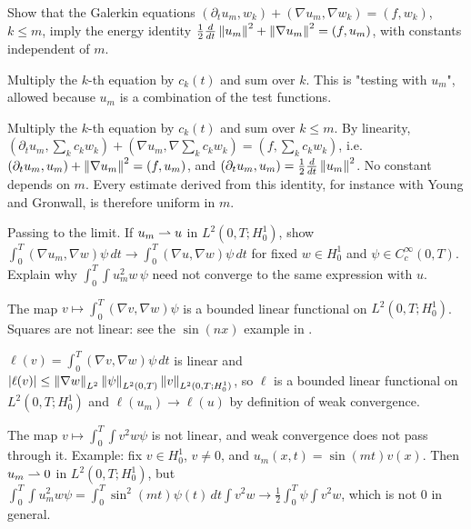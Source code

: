 \begin{exercise}
  Show that the Galerkin equations $(\partial_t u_m, w_k) + (\nabla u_m, \nabla w_k) = (f, w_k)$, $k \le m$, imply the energy identity $\frac12\frac{d}{dt}\left\lVert u_m\right\rVert^2 + \left\lVert \nabla u_m\right\rVert^2 = (f, u_m)$, with constants independent of $m$.
  \begin{hint}
    Multiply the $k$-th equation by $c_k(t)$ and sum over $k$. This is "testing with $u_m$", allowed because $u_m$ is a combination of the test functions.
  \end{hint}
  \begin{solution}
    Multiply the $k$-th equation by $c_k(t)$ and sum over $k \le m$. By linearity, $(\partial_tu_m, \sum_kc_kw_k) + (\nabla u_m, \nabla\sum_kc_kw_k) = (f, \sum_kc_kw_k)$, i.e. $(\partial_tu_m, u_m) + \left\lVert \nabla u_m\right\rVert^2 = (f, u_m)$, and $(\partial_tu_m, u_m) = \frac12\frac{d}{dt}\left\lVert u_m\right\rVert^2$. No constant depends on $m$. Every estimate derived from this identity, for instance with Young and Gronwall, is therefore uniform in $m$.
  \end{solution}
\end{exercise}

\begin{exercise}
  Passing to the limit. If $u_m \rightharpoonup u$ in $L^2(0,T;H^1_0)$, show $\int_0^T(\nabla u_m,\nabla w)\psi\,dt \to \int_0^T(\nabla u,\nabla w)\psi\,dt$ for fixed $w \in H^1_0$ and $\psi \in C_c^\infty(0,T)$. Explain why $\int_0^T\!\int u_m^2 w\,\psi$ need not converge to the same expression with $u$.
  \begin{hint}
    The map $v \mapsto \int_0^T(\nabla v,\nabla w)\psi$ is a bounded linear functional on $L^2(0,T;H^1_0)$. Squares are not linear: see the $\sin(nx)$ example in .
  \end{hint}
  \begin{solution}
    $\ell(v) = \int_0^T(\nabla v, \nabla w)\psi\,dt$ is linear and $|\ell(v)| \le \left\lVert \nabla w\right\rVert_{L^2}\left\lVert \psi\right\rVert_{L^2(0,T)}\left\lVert v\right\rVert_{L^2(0,T;H^1_0)}$, so $\ell$ is a bounded linear functional on $L^2(0,T;H^1_0)$ and $\ell(u_m) \to \ell(u)$ by definition of weak convergence.

    The map $v \mapsto \int_0^T\!\!\int v^2w\psi$ is not linear, and weak convergence does not pass through it. Example: fix $v \in H^1_0$, $v \ne 0$, and $u_m(x,t) = \sin(mt)v(x)$. Then $u_m \rightharpoonup 0$ in $L^2(0,T;H^1_0)$, but $\int_0^T\!\!\int u_m^2w\psi = \int_0^T\sin^2(mt)\psi(t)\,dt\int v^2w \to \frac12\int_0^T\psi\int v^2w$, which is not $0$ in general.
  \end{solution}
\end{exercise}

